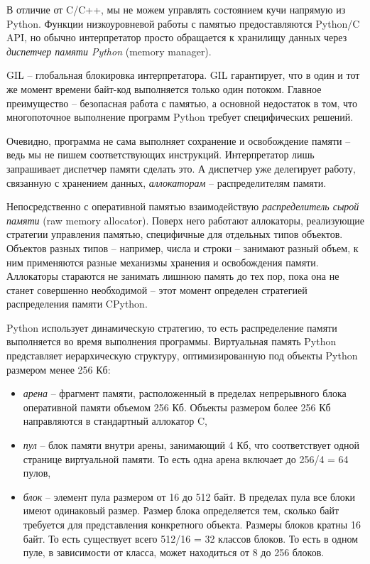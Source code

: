 \documentclass[%
	11pt,
	a4paper,
	utf8,
		]{article}
\begin{document}
В отличие от C/C++, мы не можем управлять состоянием кучи напрямую из Python. Функции низкоуровневой работы с памятью предоставляются Python/C API, но обычно интерпретатор просто обращается к хранилищу данных через \emph{диспетчер памяти Python} (memory manager).

GIL -- глобальная блокировка интерпретатора. GIL гарантирует, что в один и тот же момент времени байт-код выполняется только один потоком. Главное преимущество -- безопасная работа с памятью, а основной недостаток в том, что многопоточное выполнение программ Python требует специфических решений.

Очевидно, программа не сама выполняет сохранение и освобождение памяти -- ведь мы не пишем соответствующих инструкций. Интерпретатор лишь запрашивает диспетчер памяти сделать это. А диспетчер уже делегирует работу, связанную с хранением данных, \emph{аллокаторам} -- распределителям памяти.

Непосредственно с оперативной памятью взаимодействую \emph{распределитель сырой памяти} (raw memory allocator). Поверх него работают аллокаторы, реализующие стратегии управления памятью, специфичные для отдельных типов объектов. Объектов разных типов -- например, числа и строки -- занимают разный объем, к ним применяются разные механизмы хранения и освобождения памяти. Аллокаторы стараются не занимать лишнюю память до тех пор, пока она не станет совершенно необходимой -- этот момент определен стратегией распределения памяти CPython.

Python использует динамическую стратегию, то есть распределение памяти выполняется во время выполнения программы. Виртуальная память Python представляет иерархическую структуру, оптимизированную под объекты Python размером менее 256 Кб:
\begin{itemize}
	\item \emph{арена} -- фрагмент памяти, расположенный в пределах непрерывного блока оперативной памяти объемом 256 Кб. Объекты размером более 256 Кб направляются в стандартный аллокатор C,
	
	\item \emph{пул} -- блок памяти внутри арены, занимающий 4 Кб, что соответствует одной странице виртуальной памяти. То есть одна арена включает до 256/4 = 64 пулов,
	
	\item \emph{блок} -- элемент пула размером от 16 до 512 байт. В пределах пула все блоки имеют одинаковый размер. Размер блока определяется тем, сколько байт требуется для представления конкретного объекта. Размеры блоков кратны 16 байт. То есть существует всего 512/16 = 32 классов блоков. То есть в одном пуле, в зависимости от класса, может находиться от 8 до 256 блоков.
\end{itemize}
\end{document}
